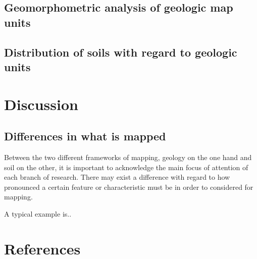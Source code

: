 \documentclass[preprint,12pt,authoryear]{elsarticle}
\begin{document}
\subsection{Geomorphometric analysis of geologic map units}
\subsection{Distribution of soils with regard to geologic units}
\section{Discussion}
\subsection{Differences in what is mapped}
Between the two different frameworks of mapping, geology on the one hand and soil on the other, it is important to acknowledge the main focus of attention of each branch of research. There may exist a difference with regard to how pronounced a certain feature or characteristic must be in order to considered for mapping. 

A typical example is..

\section*{References}

\end{document}

